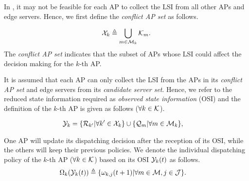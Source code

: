 In , it may not be feasible for each AP to collect the LSI from all other APs and edge servers.
Hence, we first define the \emph{conflict AP set} as follows.
\begin{definition}
    \begin{align}
        \mathcal{X}_{k} \triangleq \bigcup_{m\in\mathcal{M}_{k}} \mathcal{K}_{m}.
    \end{align}
    The \emph{conflict AP set} indicates that the subset of APs whose LSI could affect the decision making for the $k$-th AP.
\end{definition}
It is assumed that each AP can only collect the LSI from the APs in its \emph{conflict AP set} and edge servers from its \emph{candidate server set}.
Hence, we refer to the reduced state information required as \emph{observed state information} (OSI) and the definition of the $k$-th AP is given as follows ($\forall k\in\mathcal{K}$).
\begin{definition}
    \begin{align}
        \mathcal{Y}_{k} &= \{\mathcal{R}_{k'} | \forall k'\in\mathcal{X}_{k}\}
                        \cup \{\mathcal{Q}_{m} | \forall m\in\mathcal{M}_{k}\},
    \end{align}
\end{definition}

One AP will update its dispatching decision after the reception of its OSI, while the others will keep their previous policies.
We denote the individual dispatching policy of the $k$-th AP ($\forall k\in\mathcal{K}$) based on its OSI $\mathcal{Y}_{k}(t)$ as follows.
\begin{align}
    &\Omega_{k}(\mathcal{Y}_{k}(t)) \triangleq \{\omega_{k,j}(t+1)|\forall m\in\mathcal{M}, j\in\mathcal{J}\}.
    \label{def_action}
\end{align}

